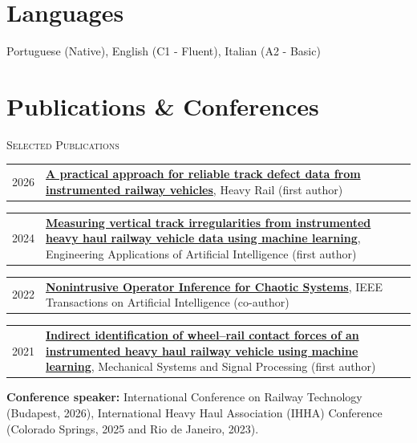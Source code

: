 \documentclass[a4paper,20pt]{article}
\makeatletter
\newcommand{\resumePub}[3]{%
  \noindent\begin{tabularx}{\textwidth}{@{}p{2.4em}@{\hspace{0.4em}}X@{}}
    {\small\textcolor[gray]{0.4}{#1}} & {\small\textbf{#2}, #3}
  \end{tabularx}\vspace{1pt}
}
\makeatother
\begin{document}
\vspace{-2pt}

\section{Languages}
\vspace{1pt}
{\small Portuguese (Native), English (C1 - Fluent), Italian (A2 - Basic)}

\vspace{-3pt}

\section{Publications \& Conferences}
\vspace{1pt}

{\scshape Selected Publications}
\vspace{2pt}

\resumePub{2026}{\href{https://doi.org/10.1016/j.hrail.2026.100007}{A practical approach for reliable track defect data from instrumented railway vehicles}}{Heavy Rail (first author)}
\resumePub{2024}{\href{https://doi.org/10.1016/j.engappai.2023.107191}{Measuring vertical track irregularities from instrumented heavy haul railway vehicle data using machine learning}}{Engineering Applications of Artificial Intelligence (first author)}
\resumePub{2022}{\href{https://doi.org/10.1109/TAI.2022.3207449}{Nonintrusive Operator Inference for Chaotic Systems}}{IEEE Transactions on Artificial Intelligence (co-author)}
\resumePub{2021}{\href{https://doi.org/10.1016/j.ymssp.2021.107806}{Indirect identification of wheel--rail contact forces of an instrumented heavy haul railway vehicle using machine learning}}{Mechanical Systems and Signal Processing (first author)}

\vspace{2pt}
{\small \textbf{Conference speaker:} International Conference on Railway Technology (Budapest, 2026), International Heavy Haul Association (IHHA) Conference (Colorado Springs, 2025 and Rio de Janeiro, 2023).\par}

\vspace{-3pt}
\end{document}
